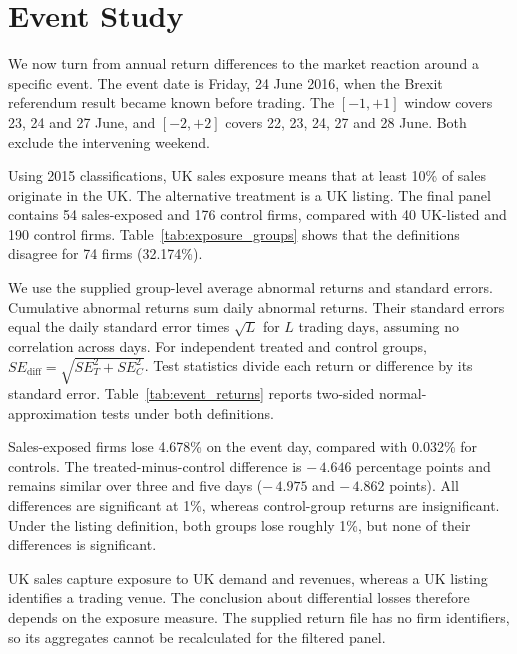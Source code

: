 \section*{Event Study}

We now turn from annual return differences to the market reaction around a specific event. The event date is Friday, 24 June 2016, when the Brexit referendum result became known before trading. The $[-1,+1]$ window covers 23, 24 and 27 June, and $[-2,+2]$ covers 22, 23, 24, 27 and 28 June. Both exclude the intervening weekend.

Using 2015 classifications, UK sales exposure means that at least 10\% of sales originate in the UK. The alternative treatment is a UK listing. The final panel contains 54 sales-exposed and 176 control firms, compared with 40 UK-listed and 190 control firms. Table~\ref{tab:exposure_groups} shows that the definitions disagree for 74 firms (32.174\%).



\newpage
We use the supplied group-level average abnormal returns and standard errors. Cumulative abnormal returns sum daily abnormal returns. Their standard errors equal the daily standard error times $\sqrt{L}$ for $L$ trading days, assuming no correlation across days. For independent treated and control groups, $SE_{\mathrm{diff}}=\sqrt{SE_T^2+SE_C^2}$. Test statistics divide each return or difference by its standard error. Table~\ref{tab:event_returns} reports two-sided normal-approximation tests under both definitions.



Sales-exposed firms lose 4.678\% on the event day, compared with 0.032\% for controls. The treated-minus-control difference is $-\,4.646$ percentage points and remains similar over three and five days ($-\,4.975$ and $-\,4.862$ points). All differences are significant at 1\%, whereas control-group returns are insignificant. Under the listing definition, both groups lose roughly 1\%, but none of their differences is significant.

UK sales capture exposure to UK demand and revenues, whereas a UK listing identifies a trading venue. The conclusion about differential losses therefore depends on the exposure measure. The supplied return file has no firm identifiers, so its aggregates cannot be recalculated for the filtered panel.
